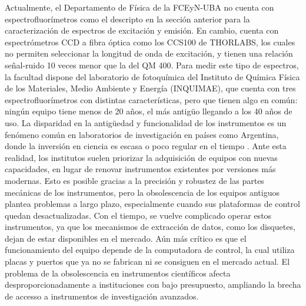 Actualmente, el Departamento de Física de la FCEyN-UBA no cuenta con espectrofluorímetros como el descripto en la sección anterior para la caracterización de espectros de excitación y emisión.  
En cambio, cuenta con espectrómetros CCD a fibra óptica como los CCS100 de THORLABS, los cuales no permiten seleccionar la longitud de onda de excitación, y tienen una relación señal-ruido 10 veces menor que la del QM 400. 
Para medir este tipo de espectros, la facultad dispone del laboratorio de fotoquímica del Instituto de Química Física de los Materiales, Medio Ambiente y Energía (INQUIMAE), que cuenta con tres espectrofluorímetros con distintas características, pero que tienen algo en común: ningún equipo tiene menos de 20 años, el más antigüo llegando a los 40 años de uso.
La disparidad en la antigüedad y funcionalidad de los instrumentos es un fenómeno común en laboratorios de investigación en países como Argentina, donde la inversión en ciencia es escasa o poco regular en el tiempo \cite{cioccaRealityScientificResearch2017}. 
Ante esta realidad, los institutos suelen priorizar la adquisición de equipos con nuevas capacidades, en lugar de renovar instrumentos existentes por versiones más modernas.  
Esto es posible gracias a la precisión y robustez de las partes mecánicas de los instrumentos, pero la obsolescencia de los equipos antiguos plantea problemas a largo plazo, especialmente cuando sus plataformas de control quedan desactualizadas.  
Con el tiempo, se vuelve complicado operar estos instrumentos, ya que los mecanismos de extracción de datos, como los disquetes, dejan de estar disponibles en el mercado. 
Aún más crítico es que el funcionamiento del equipo depende de la computadora de control, la cual utiliza placas y puertos que ya no se fabrican ni se consiguen en el mercado actual.  
El problema de la obsolescencia en instrumentos científicos afecta desproporcionadamente a instituciones con bajo presupuesto, ampliando la brecha de accesso a instrumentos de investigación avanzados.

